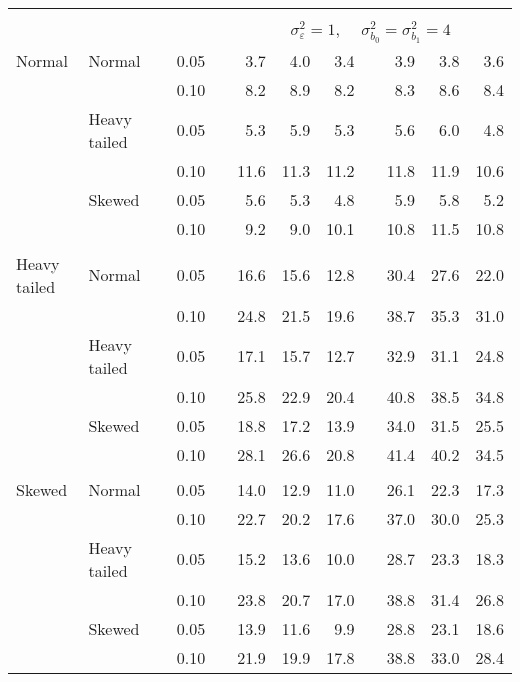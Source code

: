 \begin{table}[ht]
\begin{scriptsize}
\begin{tabular}{ll p{.1cm} c p{.1cm} rrr p{.1cm} rrr}
&&&&&&&&&&&\\
& && && \multicolumn{7}{c}{$\sigma_{\varepsilon}^2 = 1$, \ \ $\sigma_{b_0}^2 = \sigma_{b_1}^2 = 4$} \\ \cline{6-12}
\rowcolor{gray!20} Normal & Normal &  & 0.05 &  & 3.7 & 4.0 & 3.4 &  & 3.9 & 3.8 & 3.6 \\ 
\rowcolor{gray!20}    &  &  & 0.10 &  & 8.2 & 8.9 & 8.2 &  & 8.3 & 8.6 & 8.4 \\ 
\rowcolor{gray!20}    & Heavy tailed &  & 0.05 &  & 5.3 & 5.9 & 5.3 &  & 5.6 & 6.0 & 4.8 \\ 
\rowcolor{gray!20}    &  &  & 0.10 &  & 11.6 & 11.3 & 11.2 &  & 11.8 & 11.9 & 10.6 \\ 
\rowcolor{gray!20}    & Skewed &  & 0.05 &  & 5.6 & 5.3 & 4.8 &  & 5.9 & 5.8 & 5.2 \\ 
\rowcolor{gray!20}    &  &  & 0.10 &  & 9.2 & 9.0 & 10.1 &  & 10.8 & 11.5 & 10.8 \\ 
&&&&&&&&&&&\\
  Heavy tailed & Normal &  & 0.05 &  & 16.6 & 15.6 & 12.8 &  & 30.4 & 27.6 & 22.0 \\ 
   &  &  & 0.10 &  & 24.8 & 21.5 & 19.6 &  & 38.7 & 35.3 & 31.0 \\ 
   & Heavy tailed &  & 0.05 &  & 17.1 & 15.7 & 12.7 &  & 32.9 & 31.1 & 24.8 \\ 
   &  &  & 0.10 &  & 25.8 & 22.9 & 20.4 &  & 40.8 & 38.5 & 34.8 \\ 
   & Skewed &  & 0.05 &  & 18.8 & 17.2 & 13.9 &  & 34.0 & 31.5 & 25.5 \\ 
   &  &  & 0.10 &  & 28.1 & 26.6 & 20.8 &  & 41.4 & 40.2 & 34.5 \\ 
&&&&&&&&&&&\\
  Skewed & Normal &  & 0.05 &  & 14.0 & 12.9 & 11.0 &  & 26.1 & 22.3 & 17.3 \\ 
   &  &  & 0.10 &  & 22.7 & 20.2 & 17.6 &  & 37.0 & 30.0 & 25.3 \\ 
   & Heavy tailed &  & 0.05 &  & 15.2 & 13.6 & 10.0 &  & 28.7 & 23.3 & 18.3 \\ 
   &  &  & 0.10 &  & 23.8 & 20.7 & 17.0 &  & 38.8 & 31.4 & 26.8 \\ 
   & Skewed &  & 0.05 &  & 13.9 & 11.6 & 9.9 &  & 28.8 & 23.1 & 18.6 \\ 
   &  &  & 0.10 &  & 21.9 & 19.9 & 17.8 &  & 38.8 & 33.0 & 28.4 \\ 

\hline
\end{tabular}
\end{scriptsize}
\end{table}